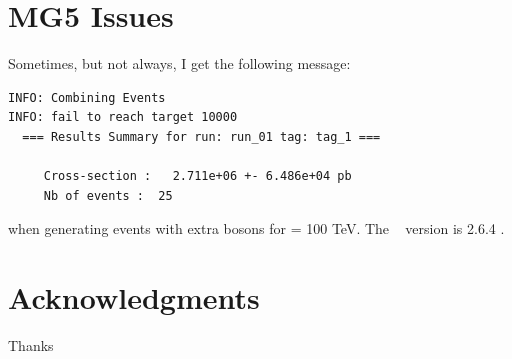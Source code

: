 \documentclass[epj,nopacs,fleqn]{svjour}
\begin{document}
\clearpage
\section{MG5 Issues}
Sometimes, but not always, I get the following message:
\begin{verbatim}
INFO: Combining Events 
INFO: fail to reach target 10000 
  === Results Summary for run: run_01 tag: tag_1 ===

     Cross-section :   2.711e+06 +- 6.486e+04 pb
     Nb of events :  25
\end{verbatim}
when generating events with extra bosons for \mchi = 100 TeV. The \MG~ version is 2.6.4 .
\clearpage



\section*{Acknowledgments}
Thanks
%


\end{document}

